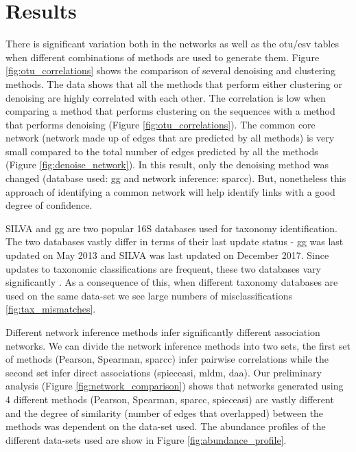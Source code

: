 
\section*{Results}

  There is significant variation both in the networks as well as the \ac{otu}/\ac{esv} tables when different combinations of methods are used to generate them.
  Figure \ref{fig:otu_correlations} shows the comparison of several denoising and clustering methods.
  The data shows that all the methods that perform either clustering or denoising are highly correlated with each other.
  The correlation is low when comparing a method that performs clustering on the sequences with a method that performs denoising (Figure \ref{fig:otu_correlations}).
  The common core network (network made up of edges that are predicted by all methods) is very small compared to the total number of edges predicted by all the methods (Figure \ref{fig:denoise_network}).
  In this result, only the denoising method was changed (database used: \ac{gg} and network inference: \ac{sparcc}).
  But, nonetheless this approach of identifying a common network will help identify links with a good degree of confidence.

  SILVA and \ac{gg} are two popular 16S databases used for taxonomy identification.
  The two databases vastly differ in terms of their last update status - \ac{gg} was last updated on May 2013 and SILVA was last updated on December 2017.
  Since updates to taxonomic classifications are frequent, these two databases vary significantly \cite{Balvociute2017}.
  As a consequence of this, when different taxonomy databases are used on the same data-set we see large numbers of misclassifications \ref{fig:tax_mismatches}.

  Different network inference methods infer significantly different association networks.
  We can divide the network inference methods into two sets, the first set of methods (Pearson, Spearman, \ac{sparcc}) infer pairwise correlations while the second set infer direct associations (\ac{spieceasi}, \ac{mldm}, \ac{daa}).
  Our preliminary analysis (Figure \ref{fig:network_comparison}) shows that networks generated using 4 different methods (Pearson, Spearman, \ac{sparcc}, \ac{spieceasi}) are vastly different and the degree of similarity (number of edges that overlapped) between the methods was dependent on the data-set used.
  The abundance profiles of the different data-sets used are show in Figure \ref{fig:abundance_profile}.

